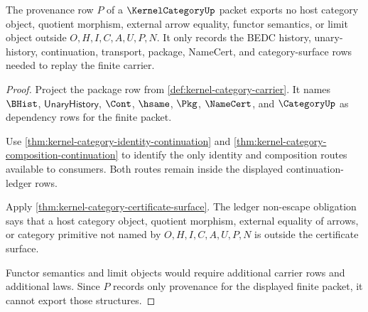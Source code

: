 \begin{theorem}
\label{thm:kernel-category-pkg-provenance-nonescape}
The provenance row $P$ of a $\KernelCategoryUp$ packet exports no host category object, quotient morphism, external arrow equality, functor semantics, or limit object outside $O,H,I,C,A,U,P,N$. It only records the BEDC history, unary-history, continuation, transport, package, NameCert, and category-surface rows needed to replay the finite carrier.
\end{theorem}
\begin{proof}
Project the package row from \autoref{def:kernel-category-carrier}. It names $\BHist$, $\mathsf{UnaryHistory}$, $\Cont$, $\hsame$, $\Pkg$, $\NameCert$, and $\CategoryUp$ as dependency rows for the finite packet.

Use \autoref{thm:kernel-category-identity-continuation} and \autoref{thm:kernel-category-composition-continuation} to identify the only identity and composition routes available to consumers. Both routes remain inside the displayed continuation-ledger rows.

Apply \autoref{thm:kernel-category-certificate-surface}. The ledger non-escape obligation says that a host category object, quotient morphism, external equality of arrows, or category primitive not named by $O,H,I,C,A,U,P,N$ is outside the certificate surface.

Functor semantics and limit objects would require additional carrier rows and additional laws. Since $P$ records only provenance for the displayed finite packet, it cannot export those structures.
\end{proof}

